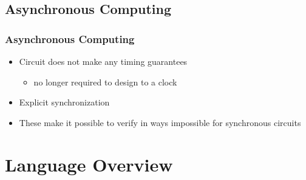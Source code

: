 \documentclass[compress]{beamer}
\begin{document}
\subsection{Asynchronous Computing}
\begin{frame}
\frametitle{Asynchronous Computing}
\begin{itemize}
\item Circuit does not make any timing guarantees
\begin{itemize}
\item no longer required to design to a clock
\end{itemize}
\item Explicit synchronization
\item These make it possible to verify in ways impossible for synchronous circuits
\end{itemize}
\end{frame}
\section{Language Overview}
\end{document}
